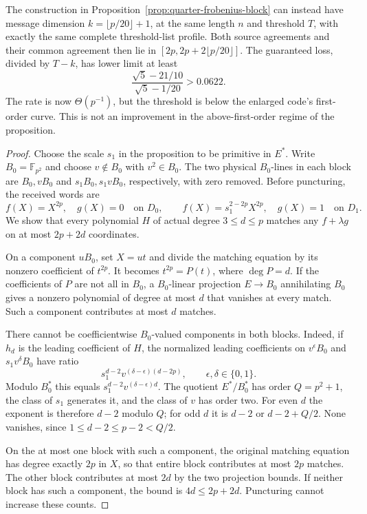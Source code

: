 \begin{corollary}
\label{cor:quarter-frobenius-growing-dimension}
The construction in Proposition~\ref{prop:quarter-frobenius-block} can
instead have message dimension $k=\lfloor p/20\rfloor+1$, at the same
length $n$ and threshold $T$, with exactly the same complete threshold-list
profile. Both source agreements and their common agreement then lie in
$[2p,2p+2\lfloor p/20\rfloor]$. The guaranteed loss, divided by $T-k$,
has lower limit at least
\[
 \frac{\sqrt5-21/10}{\sqrt5-1/20}>0.0622.
\]
The rate is now $\Theta(p^{-1})$, but the threshold is below the enlarged
code's first-order curve. This is not an improvement in the
above-first-order regime of the proposition.
\end{corollary}

\begin{proof}
Choose the scale $s_1$ in the proposition to be primitive in $E^*$.
Write $B_0=\mathbb F_{p^2}$ and choose $v\notin B_0$ with $v^2\in B_0$.
The two physical $B_0$-lines in each block are
$B_0,vB_0$ and $s_1B_0,s_1vB_0$, respectively, with zero removed.
Before puncturing, the received words are
\[
 f(X)=X^{2p},\quad g(X)=0\quad\text{on }D_0,
 \qquad
 f(X)=s_1^{2-2p}X^{2p},\quad g(X)=1\quad\text{on }D_1.
\]
We show that every polynomial $H$ of actual degree $3\le d\le p$
matches any $f+\lambda g$ on at most $2p+2d$ coordinates.

On a component $uB_0$, set $X=ut$ and divide the matching equation by
its nonzero coefficient of $t^{2p}$. It becomes $t^{2p}=P(t)$, where
$\deg P=d$. If the coefficients of $P$ are not all in $B_0$, a
$B_0$-linear projection $E\to B_0$ annihilating $B_0$ gives a nonzero
polynomial of degree at most $d$ that vanishes at every match. Such a
component contributes at most $d$ matches.

There cannot be coefficientwise $B_0$-valued components in both blocks.
Indeed, if $h_d$ is the leading coefficient of $H$, the normalized leading
coefficients on $v^\epsilon B_0$ and $s_1v^\delta B_0$ have ratio
\[
 s_1^{d-2}v^{(\delta-\epsilon)(d-2p)},
 \qquad \epsilon,\delta\in\{0,1\}.
\]
Modulo $B_0^*$ this equals $s_1^{d-2}v^{(\delta-\epsilon)d}$.
The quotient $E^*/B_0^*$ has order $Q=p^2+1$, the class of $s_1$
generates it, and the class of $v$ has order two. For even $d$ the
exponent is therefore $d-2$ modulo $Q$; for odd $d$ it is $d-2$ or
$d-2+Q/2$. None vanishes, since $1\le d-2\le p-2<Q/2$.

On the at most one block with such a component, the original matching
equation has degree exactly $2p$ in $X$, so that entire block contributes
at most $2p$ matches. The other block contributes at most $2d$ by the two
projection bounds. If neither block has such a component, the bound is
$4d\le2p+2d$. Puncturing cannot increase these counts.


\end{proof}

